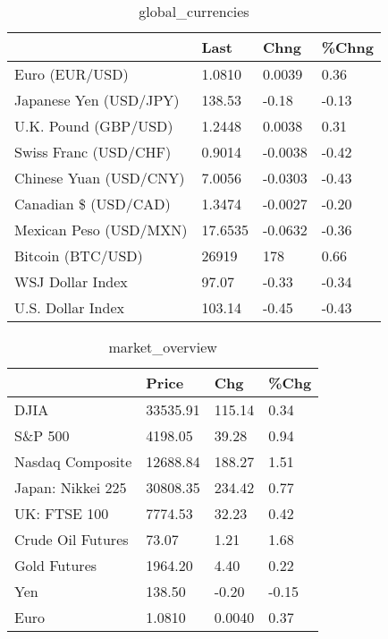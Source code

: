 \documentclass{article}%
\begin{document}
%


\begin{table}[htbp]%
\caption{global\_currencies}%
\centering%
\begin{adjustbox}{width=1\textwidth}%
\begin{tabular}{llll}
\toprule
                       &    Last &    Chng & \%Chng \\
\midrule
        Euro (EUR/USD) &  1.0810 &  0.0039 &  0.36 \\
Japanese Yen (USD/JPY) &  138.53 &   -0.18 & -0.13 \\
  U.K. Pound (GBP/USD) &  1.2448 &  0.0038 &  0.31 \\
 Swiss Franc (USD/CHF) &  0.9014 & -0.0038 & -0.42 \\
Chinese Yuan (USD/CNY) &  7.0056 & -0.0303 & -0.43 \\
  Canadian \$ (USD/CAD) &  1.3474 & -0.0027 & -0.20 \\
Mexican Peso (USD/MXN) & 17.6535 & -0.0632 & -0.36 \\
     Bitcoin (BTC/USD) &   26919 &     178 &  0.66 \\
      WSJ Dollar Index &   97.07 &   -0.33 & -0.34 \\
     U.S. Dollar Index &  103.14 &   -0.45 & -0.43 \\
\bottomrule
\end{tabular}
%
\end{adjustbox}%
\end{table}

%


\begin{table}[htbp]%
\caption{market\_overview}%
\centering%
\begin{adjustbox}{width=1\textwidth}%
\begin{tabular}{llll}
\toprule
                  &    Price &    Chg &  \%Chg \\
\midrule
             DJIA & 33535.91 & 115.14 &  0.34 \\
          S\&P 500 &  4198.05 &  39.28 &  0.94 \\
 Nasdaq Composite & 12688.84 & 188.27 &  1.51 \\
Japan: Nikkei 225 & 30808.35 & 234.42 &  0.77 \\
     UK: FTSE 100 &  7774.53 &  32.23 &  0.42 \\
Crude Oil Futures &    73.07 &   1.21 &  1.68 \\
     Gold Futures &  1964.20 &   4.40 &  0.22 \\
              Yen &   138.50 &  -0.20 & -0.15 \\
             Euro &   1.0810 & 0.0040 &  0.37 \\
\bottomrule
\end{tabular}
%
\end{adjustbox}%
\end{table}

%
\end{document}
